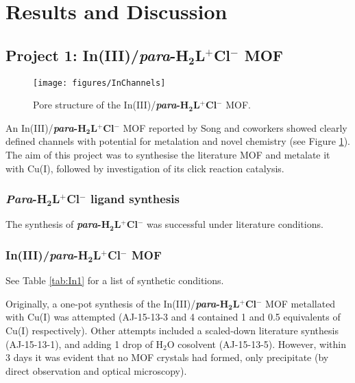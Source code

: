 \documentclass[12pt,a4paper]{article}
\begin{document}
\section{Results and Discussion}\label{sec:res_disc}

\subsection{Project 1: In(III)/\textbf{\emph{para}-H$\bm{_2}$L$\bm{^+}$Cl$\bm{^-}$} MOF}\label{sec:dis-in}
\begin{figure}[h!]
\begin{center}
\texttt{[image: figures/InChannels]}
\end{center}
\caption{Pore structure of the In(III)/\textbf{\emph{para}-H$\bm{_2}$L$\bm{^+}$Cl$\bm{^-}$} MOF.}\label{InChannels}
\end{figure}

An In(III)/\textbf{\emph{para}-H$\bm{_2}$L$\bm{^+}$Cl$\bm{^-}$} MOF reported by Song and coworkers\cite{song2015periodic} showed clearly defined channels with potential for metalation and novel chemistry (see Figure \ref{InChannels}). The aim of this project was to synthesise the literature MOF and metalate it with Cu(I), followed by investigation of its click reaction catalysis.


\subsubsection{\textbf{\emph{Para}-H$\bm{_2}$L$\bm{^+}$Cl$\bm{^-}$} ligand synthesis}\label{sec:paraLdis}
The synthesis of \textbf{\emph{para}-H$\bm{_2}$L$\bm{^+}$Cl$\bm{^-}$} was successful under literature \cite{sen2012high} conditions.

\subsubsection{In(III)/\textbf{\emph{para}-H$\bm{_2}$L$\bm{^+}$Cl$\bm{^-}$} MOF}\label{sec:in-synth-disc}
See Table \ref{tab:In1} for a list of synthetic conditions.

Originally, a one-pot synthesis of the In(III)/\textbf{\emph{para}-H$\bm{_2}$L$\bm{^+}$Cl$\bm{^-}$} MOF metallated with Cu(I) was attempted (AJ-15-13-3 and 4 contained 1 and 0.5 equivalents of Cu(I) respectively). Other attempts included a scaled-down literature synthesis (AJ-15-13-1), and adding 1 drop of H$_2$O cosolvent (AJ-15-13-5). However, within 3 days it was evident that no MOF crystals had formed, only precipitate (by direct observation and optical microscopy).
\end{document}
